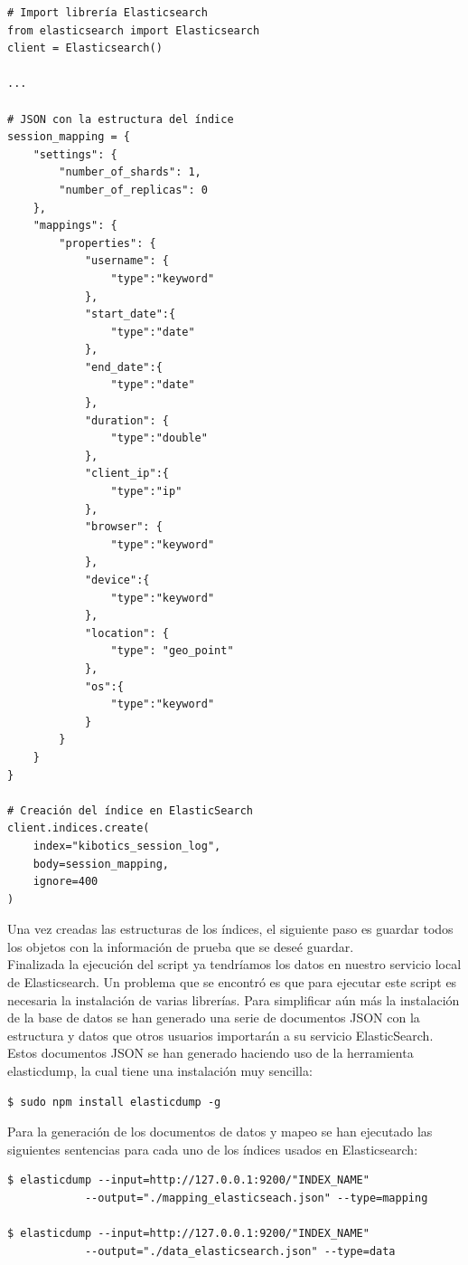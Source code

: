\documentclass[11pt,a4paper]{book}
\begin{document}
				\begin{Verbatim}[tabsize=4]
# Import librería Elasticsearch
from elasticsearch import Elasticsearch
client = Elasticsearch()

...

# JSON con la estructura del índice
session_mapping = {
	"settings": {
		"number_of_shards": 1,
		"number_of_replicas": 0
	},
	"mappings": {
		"properties": {
			"username": {
				"type":"keyword"
			},
			"start_date":{
				"type":"date"
			},
			"end_date":{
				"type":"date"
			},
			"duration": {
				"type":"double"
			},
			"client_ip":{
				"type":"ip"
			},
			"browser": {
				"type":"keyword"
			},
			"device":{
				"type":"keyword"
			},
			"location": {
				"type": "geo_point"
			},
			"os":{
				"type":"keyword"
			}
		}
	}
}

# Creación del índice en ElasticSearch
client.indices.create(
	index="kibotics_session_log",
	body=session_mapping,
	ignore=400
)
				\end{Verbatim}
				
				Una vez creadas las estructuras de los índices, el siguiente paso es guardar todos los objetos con la información de prueba que se deseé guardar.\\
				
				Finalizada la ejecución del script ya tendríamos los datos en nuestro servicio local de Elasticsearch. Un problema que se encontró es que para ejecutar este script es necesaria la instalación de varias librerías. Para simplificar aún más la instalación de la base de datos se han generado una serie de documentos JSON con la estructura y datos que otros usuarios importarán a su servicio ElasticSearch.\\
				
				Estos documentos JSON se han generado haciendo uso de la herramienta elasticdump, la cual tiene una instalación muy sencilla:
							
				\begin{Verbatim}[tabsize=4]
$ sudo npm install elasticdump -g
				\end{Verbatim}
				
				Para la generación de los documentos de datos y mapeo se han ejecutado las siguientes sentencias para cada uno de los índices usados en Elasticsearch:

				\begin{Verbatim}[tabsize=4]
$ elasticdump --input=http://127.0.0.1:9200/"INDEX_NAME" 
			--output="./mapping_elasticseach.json" --type=mapping
			
$ elasticdump --input=http://127.0.0.1:9200/"INDEX_NAME" 
			--output="./data_elasticsearch.json" --type=data

				\end{Verbatim}
				
\end{document}
